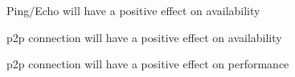 
\begin{description}[style=nextline]
  \item[S1\label{s1}] Ping/Echo will have a positive effect on availability
  \item[S2\label{s2}] \gls{p2p} connection will have a positive effect on availability
  \item[S3\label{s3}] \gls{p2p} connection will have a positive effect on performance
\end{description}
